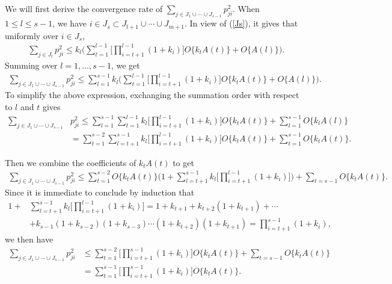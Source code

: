 \documentclass{statsoc}
\begin{document}
We will first derive the convergence rate of $\sum_{j \in J_1 \cup \cdots \cup J_{s - 1}} p_{ji}^2$. When $1 \leq l \leq s - 1$, we have $i \in J_{s} \subset J_{l + 1} \cup \cdots \cup J_{m + 1}$. In view of (\ref{Js}), it gives that uniformly over $i \in J_{s}$,
\begin{align*}
\sum_{j \in J_{l}} p_{ji}^2 \leq k_l\big(\sum_{t = 1}^{l - 1} \big[\prod_{i = t + 1}^{l - 1} (1 + k_i)] O\{k_t A(t)\} + O\{A(l)\}\big).
\end{align*}
Summing over $l = 1, \dots, s - 1$, we get
\begin{align*}
\sum_{j \in J_1 \cup \cdots \cup J_{s - 1}} p_{ji}^2 \leq \sum_{l = 1}^{s - 1} k_l \big(\sum_{t = 1}^{l - 1} \big[\prod_{i = t + 1}^{l - 1} (1 + k_i)\big] O\{k_t A(t)\} + O\{A(l)\}\big).
\end{align*}
To simplify the above expression, exchanging the summation order with respect to $l$ and $t$ gives
\begin{align*}
\sum_{j \in J_1 \cup \cdots \cup J_{s - 1}} & p_{ji}^2 \leq \sum_{l = 1}^{s - 1} \sum_{t = 1}^{l - 1} k_l \big[\prod_{i = t + 1}^{l - 1}(1 + k_i)\big] O\{k_t A(t)\} + \sum_{l = 1}^{s - 1} O\{k_l A(l)\}\\
& = \sum_{t = 1}^{s - 2} \sum_{l = t + 1}^{s - 1} k_l \big[\prod_{i = t + 1}^{l - 1}(1 + k_i)\big] O\{k_t A(t)\} + \sum_{t = 1}^{s - 1} O\{k_t A(t)\}.
\end{align*}

Then we combine the coefficients of $k_t A(t)$ to get
\begin{align*}
\sum_{j \in J_1 \cup \cdots \cup J_{s - 1}} p_{ji}^2 \leq \sum_{t = 1}^{s - 2} O\{k_t A(t)\} \big(1 + \sum_{l = t + 1}^{s - 1} k_l \big[\prod_{i = t + 1}^{l - 1}(1 + k_i)\big] \big) + \sum_{t = s - 1} O\{k_t A(t)\}.
\end{align*}
Since it is immediate to conclude by induction that
\begin{align*}
1 + &\sum_{l = t + 1}^{s - 1} k_l \big[\prod_{i = t + 1}^{l - 1}(1 + k_i)\big] = 1 + k_{t + 1} + k_{t + 2}(1 + k_{t + 1}) + \cdots \\ %
&+ k_{s - 1} (1 + k_{s - 2})(1 + k_{s - 3})\cdots(1 + k_{t + 2})(1 + k_{t + 1}) = \prod_{i = t + 1}^{s - 1} (1 + k_i),
\end{align*}
we then have
\begin{align*}
\sum_{j \in J_1 \cup \cdots \cup J_{s - 1}} p_{ji}^2 &\leq \sum_{t = 1}^{s - 2} \big[\prod_{i = t + 1}^{s - 1}(1 + k_i)\big] O\{k_t A(t)\} + \sum_{t = s - 1} O\{k_t A(t)\} \\
&= \sum_{t = 1}^{s - 1} \big[\prod_{i = t + 1}^{s - 1} (1 + k_i)\big] O\{k_t A(t)\}.
\end{align*}
\end{document}
